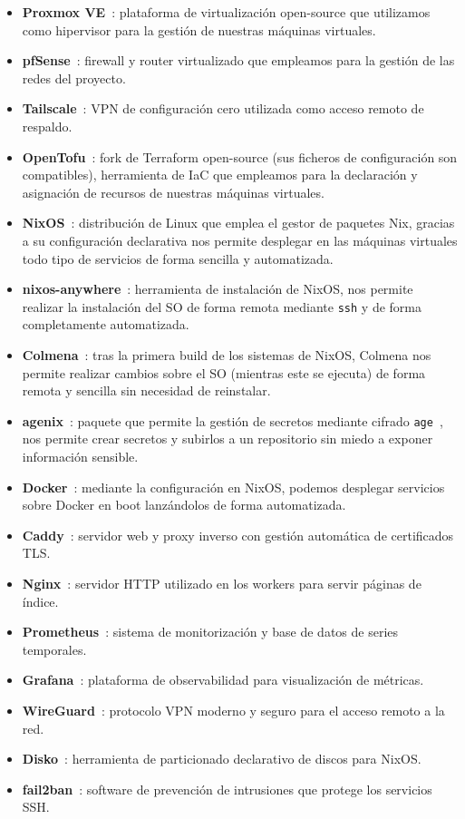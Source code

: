 \documentclass[a4paper, 11pt]{article}
\begin{document}
\begin{itemize}
  \item \textbf{Proxmox VE}~\cite{proxmox}: plataforma de virtualización open-source que utilizamos como
    hipervisor para la gestión de nuestras máquinas virtuales.
  \item \textbf{pfSense}~\cite{pfsense}: firewall y router virtualizado que empleamos para la gestión de las redes del proyecto.
  \item \textbf{Tailscale}~\cite{tailscale}: VPN de configuración cero utilizada como acceso remoto de respaldo.
  \item \textbf{OpenTofu}~\cite{opentofu}: fork de Terraform open-source (sus ficheros de configuración son compatibles),
    herramienta de IaC que empleamos para la declaración y asignación de recursos de nuestras máquinas virtuales.
  \item \textbf{NixOS}~\cite{nixos}: distribución de Linux que emplea el gestor de paquetes Nix, gracias a su configuración
    declarativa nos permite desplegar en las máquinas virtuales todo tipo de servicios de forma sencilla y automatizada.
  \item \textbf{nixos-anywhere}~\cite{nixos-anywhere}: herramienta de instalación de NixOS, nos permite realizar la instalación del SO
    de forma remota mediante \texttt{ssh} y de forma completamente automatizada.
  \item \textbf{Colmena}~\cite{colmena}: tras la primera build de los sistemas de NixOS, Colmena nos permite realizar cambios sobre
    el SO (mientras este se ejecuta) de forma remota y sencilla sin necesidad de reinstalar.
  \item \textbf{agenix}~\cite{agenix}: paquete que permite la gestión de secretos mediante cifrado
    \texttt{age}~\cite{age}, nos permite crear secretos y subirlos a un repositorio sin miedo a exponer información sensible.
  \item \textbf{Docker}~\cite{docker}: mediante la configuración en NixOS, podemos desplegar servicios
    sobre Docker en boot lanzándolos de forma automatizada.
  \item \textbf{Caddy}~\cite{caddy}: servidor web y proxy inverso con gestión automática de certificados TLS.
  \item \textbf{Nginx}~\cite{nginx}: servidor HTTP utilizado en los workers para servir páginas de índice.
  \item \textbf{Prometheus}~\cite{prometheus}: sistema de monitorización y base de datos de series temporales.
  \item \textbf{Grafana}~\cite{grafana}: plataforma de observabilidad para visualización de métricas.
  \item \textbf{WireGuard}~\cite{wireguard}: protocolo VPN moderno y seguro para el acceso remoto a la red.
  \item \textbf{Disko}~\cite{disko}: herramienta de particionado declarativo de discos para NixOS.
  \item \textbf{fail2ban}~\cite{fail2ban}: software de prevención de intrusiones que protege los servicios SSH.
\end{itemize}
\end{document}
